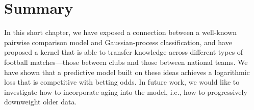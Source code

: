 \section{Summary}
\label{pk:sec:summary}

In this short chapter, we have exposed a connection between a well-known pairwise comparison model and Gaussian-process classification, and have proposed a kernel that is able to transfer knowledge across different types of football matches---those between clubs and those between national teams.
We have shown that a predictive model built on these ideas achieves a logarithmic loss that is competitive with betting odds.
In future work, we would like to investigate how to incorporate aging into the model, i.e., how to progressively downweight older data.
